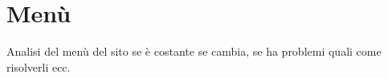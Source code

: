 \section{Menù}
Analisi del menù del sito se è costante se cambia, se ha problemi quali come risolverli ecc.